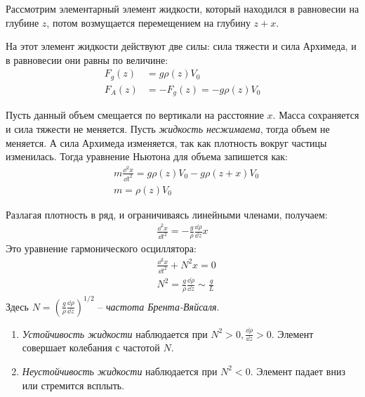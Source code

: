 Рассмотрим элементарный элемент жидкости, который находился в равновесии на глубине $z$, потом возмущается перемещением на глубину $z+x$.

На этот элемент жидкости действуют две силы: сила тяжести и сила Архимеда, и в равновесии они равны  по величине:
\begin{align*}
F _ { g } ( z ) &= g \rho ( z ) V_0 \\
F _ { A } ( z ) &= - F _ { g } ( z ) = - g \rho ( z ) V_0
\end{align*}

Пусть данный объем смещается по вертикали на расстояние $x$. Масса сохраняется и сила тяжести не меняется.  Пусть \textit{жидкость несжимаема}, тогда объем не меняется. А сила Архимеда изменяется, так как плотность вокруг частицы изменилась. Тогда уравнение  Ньютона для объема запишется как:
\begin{align*}
& m \frac { \dd ^ { 2 } x } { \dd t ^ { 2 } } = g \rho ( z ) V_0 - g \rho ( z + x ) V_0 \\
& m = \rho ( z ) V_0
\end{align*}

Разлагая плотность в ряд, и ограничиваясь линейными членами, получаем:
\begin{align*}
\frac { \dd ^ { 2 } x } { \dd t ^ { 2 } } = - \frac { g } { \rho } \frac { \dd \rho } { \dd z } x
\end{align*}
Это уравнение гармонического осциллятора:
\begin{align*}
& \frac { \dd ^ { 2 } x } { \dd t ^ { 2 } } + N ^ { 2 } x = 0 \\
& N ^ { 2 } = \frac { g } { \rho } \frac { \dd \rho } { \dd z } \sim \frac { g } { L }
\end{align*}
Здесь $\displaystyle N = \left( \frac { g } { \rho } \frac { \dd \rho } { \dd z } \right) ^ { 1 / 2 } $ -- \textit{частота Брента-Вяйсаля}.
\begin{enumerate}
	\item {\textit{Устойчивость жидкости} наблюдается при $ N ^ { 2 } > 0 , \frac { \dd \rho } { \dd z } > 0$. Элемент совершает колебания с частотой $N$.}
	\item {\textit{Неустойчивость жидкости} наблюдается при $ N ^ { 2 } < 0 $. Элемент падает вниз или стремится всплыть.}
\end{enumerate}


